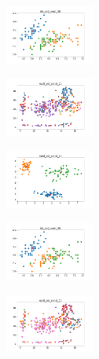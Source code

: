 \begin{figure}[H]
    \hfill
    \begin{subfigure}
        \centering
        \includegraphics[width=0.32\textwidth]{img/copkm/iris_set_const_20_589741062_clust.png}
    \end{subfigure}
    \hfill
    \begin{subfigure}
        \centering
        \includegraphics[width=0.32\textwidth]{img/copkm/ecoli_set_const_20_589741062_clust.png}
    \end{subfigure}
    \hfill
    \begin{subfigure}
        \centering
        \includegraphics[width=0.32\textwidth]{img/copkm/rand_set_const_20_589741062_clust.png}
    \end{subfigure}
    \hfill
    \begin{subfigure}
        \centering
        \includegraphics[width=0.32\textwidth]{img/copkm/iris_set_const_20_277451237_clust.png}
    \end{subfigure}
    \hfill
    \begin{subfigure}
        \centering
        \includegraphics[width=0.32\textwidth]{img/copkm/ecoli_set_const_20_277451237_clust.png}

\end{subfigure}
\end{figure}
